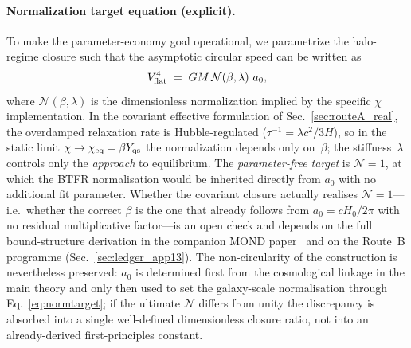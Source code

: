 \documentclass[11pt]{article}
\begin{document}
\paragraph{Normalization target equation (explicit).}
To make the parameter-economy goal operational, we parametrize the halo-regime closure such that the asymptotic circular speed can be written as
\begin{equation}
V_{\rm flat}^4 \;=\; G M\,\mathcal{N}\!\left(\beta,\lambda\right)\,a_0,
\label{eq:normtarget}
\end{equation}
where $\mathcal{N}(\beta,\lambda)$ is the dimensionless normalization implied by the specific $\chi$ implementation.  In the covariant effective formulation of Sec.~\ref{sec:routeA_real}, the overdamped relaxation rate is Hubble-regulated ($\tau^{-1}=\lambda c^2/3H$), so in the static limit $\chi\to\chi_{\rm eq}=\beta Y_{\rm qs}$ the normalization depends only on~$\beta$; the stiffness~$\lambda$ controls only the \emph{approach} to equilibrium.  The \emph{parameter-free target} is $\mathcal{N}=1$, at which the BTFR normalisation would be inherited directly from $a_0$ with no additional fit parameter.  Whether the covariant closure actually realises $\mathcal{N}=1$---i.e.\ whether the correct $\beta$ is the one that already follows from $a_0=cH_0/2\pi$ with no residual multiplicative factor---is an open check and depends on the full bound-structure derivation in the companion MOND paper~\cite{Lotishvili2026MOND} and on the Route~B programme (Sec.~\ref{sec:ledger_app13}).  The non-circularity of the construction is nevertheless preserved: $a_0$ is determined first from the cosmological linkage in the main theory and only then used to set the galaxy-scale normalisation through Eq.~\eqref{eq:normtarget}; if the ultimate $\mathcal{N}$ differs from unity the discrepancy is absorbed into a single well-defined dimensionless closure ratio, not into an already-derived first-principles constant.
\end{document}
